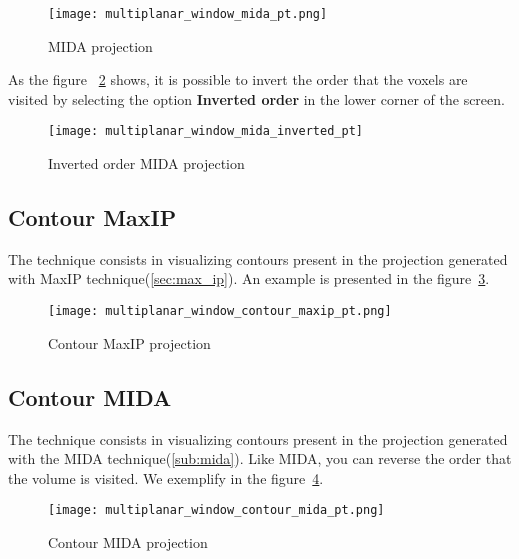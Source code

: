 \begin{figure}[H]
\centering
\texttt{[image: multiplanar\_window\_mida\_pt.png]}
\caption{MIDA projection}
\label{fig:proj_MIDA}
\end{figure}

As the figure ~\ref{fig:proj_MIDA_inv} shows, it is possible to invert the order that the voxels are visited by selecting the option \textbf{Inverted order} in the lower corner of the screen.

\begin{figure}[H]
\centering
\texttt{[image: multiplanar\_window\_mida\_inverted\_pt]}
\caption{Inverted order MIDA projection}
\label{fig:proj_MIDA_inv}
\end{figure}

\subsection{Contour MaxIP}

The technique consists in visualizing contours present in the projection generated with MaxIP technique(\ref{sec:max_ip}). An example is presented in the figure~\ref{fig:proj_contorno_maxip}.

\begin{figure}[H]
\centering
\texttt{[image: multiplanar\_window\_contour\_maxip\_pt.png]}
\caption{Contour MaxIP projection}
\label{fig:proj_contorno_maxip}
\end{figure}

\subsection{Contour MIDA}

The technique consists in visualizing contours present in the projection generated with the MIDA technique(\ref{sub:mida}). Like MIDA, you can reverse the order that the volume is visited. We exemplify in the figure~\ref{fig:proj_contorno_mida}.

\begin{figure}[H]
\centering
\texttt{[image: multiplanar\_window\_contour\_mida\_pt.png]}
\caption{Contour MIDA projection}
\label{fig:proj_contorno_mida}
\end{figure}